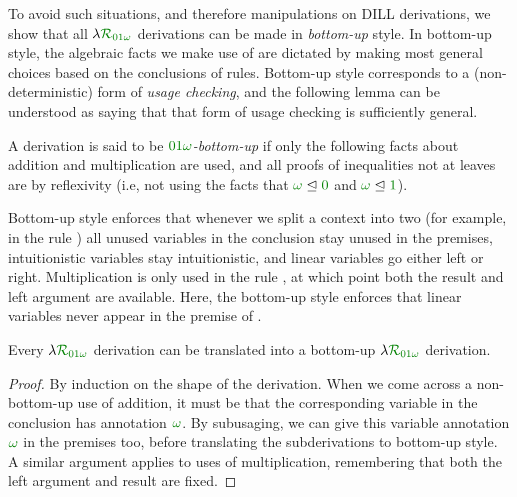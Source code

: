 \documentclass[submission,copyright,creativecommons]{eptcs}
\begin{document}
To avoid such situations, and therefore manipulations on DILL derivations, we
show that all $\name_{\instDILL}$ derivations can be made in \emph{bottom-up}
style.
In bottom-up style, the algebraic facts we make use of are dictated by making
most general choices based on the conclusions of rules.
Bottom-up style corresponds to a (non-deterministic) form of
\emph{usage checking}, and the following lemma can be understood as saying
that that form of usage checking is sufficiently general.

\begin{definition}
  A derivation is said to be \emph{$\instDILL$-bottom-up} if only the following
  facts about addition and multiplication are used, and all proofs of
  inequalities not at leaves are by reflexivity (i.e, not using the facts that
  $\unrestricted \subres \zero$ and $\unrestricted \subres \linear$).

\end{definition}

Bottom-up style enforces that whenever we split a context into two (for
example, in the rule ) all unused variables in the
conclusion stay unused in the premises, intuitionistic variables stay
intuitionistic, and linear variables go either left or right.
Multiplication is only used in the rule , at which point
both the result and left argument are available.
Here, the bottom-up style enforces that linear variables never appear in the
premise of .

\begin{lemma}
  Every $\name_{\instDILL}$ derivation can be translated into a bottom-up
  $\name_{\instDILL}$ derivation.
\end{lemma}
\begin{proof}
  By induction on the shape of the derivation.
  When we come across a non-bottom-up use of addition, it must be that the
  corresponding variable in the conclusion has annotation $\unrestricted$.
  By subusaging, we can give this variable annotation $\unrestricted$ in
  the premises too, before translating the subderivations to bottom-up
  style.
  A similar argument applies to uses of multiplication, remembering that both
  the left argument and result are fixed.
\end{proof}
\end{document}
